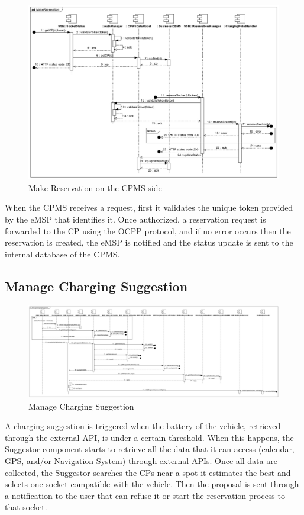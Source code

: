 \documentclass{Configuration_Files/PoliMi3i_thesis}
\begin{document}
\begin{figure}[H]
    \centering
    \includegraphics[width=1\textwidth]{Images/sequenceDiagrams/MakeReservation-CPMS.jpg}
    \caption{Make Reservation on the CPMS side}
\end{figure}
When the CPMS receives a request, first it validates the unique token provided by the eMSP that identifies it. Once authorized, a reservation request is forwarded to the CP using the OCPP protocol, and if no error occurs then the reservation is created, the eMSP is notified and the status update is sent to the internal database of the CPMS.


\subsection{Manage Charging Suggestion}
\begin{figure}[H]
    \centering
    \includegraphics[width=1\textwidth]{Images/sequenceDiagrams/ManageChargingSuggestion.jpg}
    \caption{Manage Charging Suggestion}
\end{figure}
A charging suggestion is triggered when the battery of the vehicle, retrieved through the external API, is under a certain threshold. When this happens, the Suggestor component starts to retrieve all the data that it can access (calendar, GPS, and/or Navigation System) through external APIs. Once all data are collected, the Suggestor searches the CPs near a spot it estimates the best and selects one socket compatible with the vehicle. Then the proposal is sent through a notification to the user that can refuse it or start the reservation process to that socket.
\end{document}
